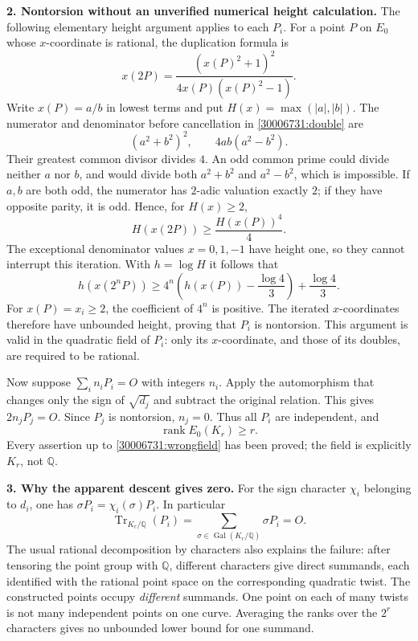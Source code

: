 \documentclass[11pt,a4paper]{article}
\newcommand{\Q}{\mathbb{Q}}
\numberwithin{equation}{section}
\begin{document}
\medskip
\textbf{2. Nontorsion without an unverified numerical height calculation.}
The following elementary height argument applies to each $P_i$. For a point
$P$ on $E_0$ whose $x$-coordinate is rational, the duplication formula is
\begin{equation}\label{30006731:double}
 x(2P)=\frac{(x(P)^2+1)^2}{4x(P)(x(P)^2-1)}.
\end{equation}
Write $x(P)=a/b$ in lowest terms and put $H(x)=\max(|a|,|b|)$. The numerator
and denominator before cancellation in \eqref{30006731:double} are
\[
 (a^2+b^2)^2,\qquad 4ab(a^2-b^2).
\]
Their greatest common divisor divides $4$. An odd common prime could divide
neither $a$ nor $b$, and would divide both $a^2+b^2$ and $a^2-b^2$, which is
impossible. If $a,b$ are both odd, the numerator has $2$-adic valuation
exactly $2$; if they have opposite parity, it is odd. Hence, for $H(x)\geq2$,
\begin{equation}\label{30006731:height}
 H(x(2P))\geq\frac{H(x(P))^4}{4}.
\end{equation}
The exceptional denominator values $x=0,1,-1$ have height one, so they cannot
interrupt this iteration. With $h=\log H$ it follows that
\[
 h(x(2^nP))\geq
 4^n\left(h(x(P))-\frac{\log4}{3}\right)+\frac{\log4}{3}.
\]
For $x(P)=x_i\geq2$, the coefficient of $4^n$ is positive. The iterated
$x$-coordinates therefore have unbounded height, proving that $P_i$ is
nontorsion. This argument is valid in the quadratic field of $P_i$: only
its $x$-coordinate, and those of its doubles, are required to be rational.

Now suppose $\sum_i n_iP_i=O$ with integers $n_i$. Apply the automorphism
that changes only the sign of $\sqrt{d_j}$ and subtract the original
relation. This gives $2n_jP_j=O$. Since $P_j$ is nontorsion, $n_j=0$.
Thus all $P_i$ are independent, and
\begin{equation}\label{30006731:wrongfield}
 \operatorname{rank}E_0(K_r)\geq r.
\end{equation}
Every assertion up to \eqref{30006731:wrongfield} has been proved; the field is
explicitly $K_r$, not $\Q$.

\medskip
\textbf{3. Why the apparent descent gives zero.}
For the sign character $\chi_i$ belonging to $d_i$, one has
$\sigma P_i=\chi_i(\sigma)P_i$. In particular
\[
 \operatorname{Tr}_{K_r/\Q}(P_i)
 =\sum_{\sigma\in\operatorname{Gal}(K_r/\Q)}\sigma P_i=O.
\]
The usual rational decomposition by characters also explains the failure:
after tensoring the point group with $\Q$, different characters give direct
summands, each identified with the rational point space on the corresponding
quadratic twist. The constructed points occupy \emph{different} summands.
One point on each of many twists is not many independent points on one
curve. Averaging the ranks over the $2^r$ characters gives no unbounded
lower bound for one summand.
\end{document}
